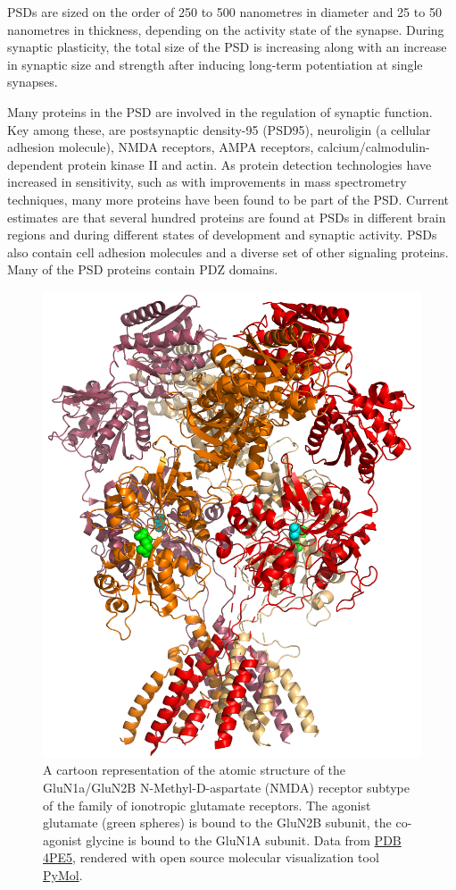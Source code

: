 PSDs are sized on the order of 250 to 500 nanometres in diameter and 25 to 50 nanometres in thickness, depending on the activity state of the synapse. During synaptic plasticity, the total size of the PSD is increasing along with an increase in synaptic size and strength after inducing long-term potentiation at single synapses.

Many proteins in the PSD are involved in the regulation of synaptic function. Key among these, are postsynaptic density-95 (PSD95), neuroligin (a cellular adhesion molecule), NMDA receptors, AMPA receptors, calcium/calmodulin-dependent protein kinase II and actin. As protein detection technologies have increased in sensitivity, such as with improvements in mass spectrometry techniques, many more proteins have been found to be part of the PSD. Current estimates are that several hundred proteins are found at PSDs in different brain regions and during different states of development and synaptic activity. PSDs also contain cell adhesion molecules and a diverse set of other signaling proteins. Many of the PSD proteins contain PDZ domains.



\begin{figure}

{\centering \includegraphics[width=0.7\linewidth]{./figures/synapse/NMDA_receptor} 

}

\caption{A cartoon representation of the atomic structure of the GluN1a/GluN2B N-Methyl-D-aspartate (NMDA) receptor subtype of the family of ionotropic glutamate receptors. The agonist glutamate (green spheres) is bound to the GluN2B subunit, the co-agonist glycine is bound to the GluN1A subunit. Data from \href{https://www.rcsb.org/structure/4PE5}{PDB 4PE5}, rendered with open source molecular visualization tool \href{https://pymol.org/2/}{PyMol}.}\label{fig:nmdar}
\end{figure}

